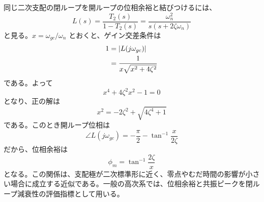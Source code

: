 同じ二次支配の閉ループを開ループの位相余裕と結びつけるには、
\begin{equation}
  L(s)=\frac{T_2(s)}{1-T_2(s)}
  =\frac{\omega_n^2}{s(s+2\zeta\omega_n)}
\end{equation}
と見る。$x=\omega_{gc}/\omega_n$ とおくと、ゲイン交差条件は
\begin{align}
  1&=\left|L(j\omega_{gc})\right|\\
  &=\frac{1}{x\sqrt{x^2+4\zeta^2}}
\end{align}
である。よって
\begin{equation}
  x^4+4\zeta^2x^2-1=0
\end{equation}
となり、正の解は
\begin{equation}
  x^2=-2\zeta^2+\sqrt{4\zeta^4+1}
\end{equation}
である。このとき開ループ位相は
\begin{equation}
  \angle L(j\omega_{gc})=-\frac{\pi}{2}-\tan^{-1}\frac{x}{2\zeta}
\end{equation}
だから、位相余裕は
\begin{equation}
  \phi_m=\tan^{-1}\frac{2\zeta}{x}
\end{equation}
となる。この関係は、支配極が二次標準形に近く、零点やむだ時間の影響が小さい場合に成立する近似である。一般の高次系では、位相余裕と共振ピークを閉ループ減衰性の評価指標として用いる。

